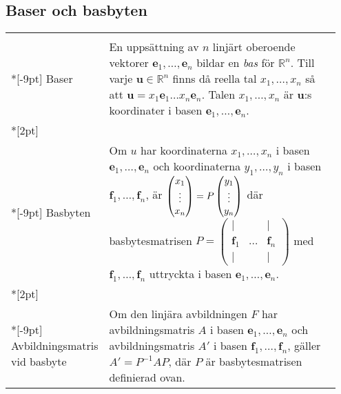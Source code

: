 \documentclass[a4paper]{article}
\def\trevektor[#1,#2,#3]{\begin{pmatrix}#1\cr #2\cr #3\end{pmatrix}}
\def\Rone{{\mathbb R}}
\let\R\Rone
\def\vec#1{\mathbf #1} %
\begin{document}
\subsection*{Baser och basbyten}
\begin{tabular}{|p{0.2\linewidth}|p{0.75\linewidth}|}
  \hline\\*[-9pt]
  Baser&En uppsättning av $n$ linjärt oberoende vektorer $\vec e_1,\dots,\vec
  e_n$ bildar en \emph{bas} för $\R^n$. Till varje $\vec u\in\R^n$ finns
  då reella tal $x_1,\dots,x_n$ så att $\vec u=x_1\vec e_1\dots x_n\vec
  e_n$. Talen $x_1,\dots,x_n$ är $\vec u$:s koordinater i basen 
  $\vec e_1,\dots,\vec e_n$.
  \\*[2pt] \hline\\*[-9pt]
  Basbyten&Om $u$ har koordinaterna $x_1,\dots,x_n$ i basen $\vec e_1,\dots,\vec
  e_n$ och koordinaterna $y_1,\dots,y_n$ i basen $\vec f_1,\dots,\vec
  f_n$, är $\trevektor[x_1,\vdots,x_n]
           =P\trevektor[y_1,\vdots,y_n]$ där
  basbytesmatrisen $P=
  \begin{pmatrix}
    |&&|\\
    \vec f_1&\dots&\vec f_n\\
    |&&|
  \end{pmatrix}$ med $\vec f_1,\dots,\vec f_n$ uttryckta i basen
  $\vec e_1,\dots,\vec e_n$.
  \\*[2pt] \hline\\*[-9pt]
  Avbildningsmatris vid basbyte&Om den linjära avbildningen $F$ har
  avbildningsmatris $A$ i basen $\vec e_1,\dots,\vec e_n$ och
  avbildningsmatris $A'$ i basen $\vec f_1,\dots,\vec f_n$, gäller
  $A'=P^{-1}AP$, där $P$ är basbytesmatrisen definierad ovan.\\
  \hline
\end{tabular}
\end{document}

